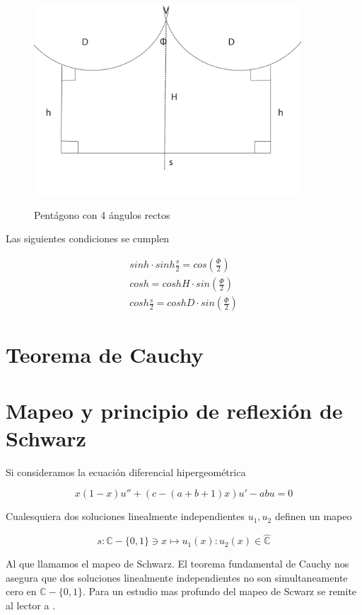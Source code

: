 \begin{figure}[h]
  \centering
  \includegraphics[width=10cm]{apendice2}\\
  \caption{Pent\'agono con 4 \'angulos rectos}\label{apendice2}
\end{figure}

Las siguientes condiciones se cumplen 

\begin{eqnarray}
sinh \cdot sinh \frac{s}{2}= cos (\frac{\Phi}{2}) \\
cosh=coshH \cdot sin (\frac{\Phi}{2}) \\
cosh \frac{s}{2} = coshD \cdot sin (\frac{\Phi}{2})
\end{eqnarray}


\section{Teorema de Cauchy}


\section{Mapeo y principio de reflexi\'on de Schwarz}

Si consideramos la ecuaci\'on diferencial hipergeom\'etrica 

$$ x(1-x)u''+(c-(a+b+1)x)u'-abu=0$$

Cualesquiera dos soluciones linealmente independientes $u_{1},u_{2}$ definen un mapeo

$$s: \mathbb{C}-\lbrace 0,1 \rbrace \ni x \mapsto u_{1}(x):u_{2}(x) \in \widehat{\mathbb{C}} $$

Al que llamamos el mapeo de Schwarz. El teorema fundamental de Cauchy nos asegura que dos soluciones linealmente independientes no son simultaneamente cero en $\mathbb{C}-\lbrace 0,1 \rbrace $. Para un estudio mas profundo del mapeo de Scwarz se remite al lector a \cite{geometricstudy}.

